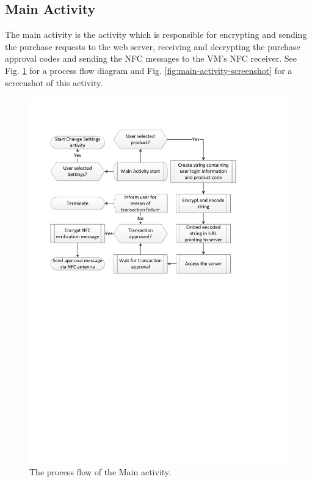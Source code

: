 \subsection{Main Activity}

The main activity is the activity which is responsible for encrypting and
sending the purchase requests to the web server, receiving and decrypting
the purchase approval codes and sending the NFC messages to the VM's
NFC receiver. See Fig. \ref{fig:main-activity} for a process flow diagram
and Fig. \ref{fig:main-activity-screenshot} for a screenshot of this activity.

\begin{figure}
 \centering 
 \includegraphics[clip = true, trim = 0 430 50 76,
 scale=0.7]{app_main_processflow}
 \caption{The process flow of the Main activity.}
 \label{fig:main-activity}
\end{figure}

